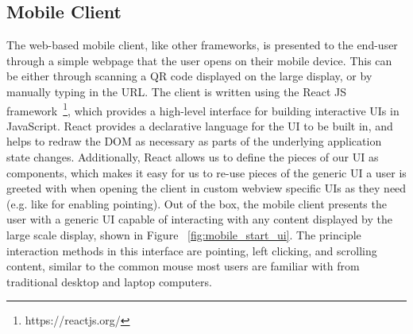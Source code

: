 \subsection{Mobile Client}

The web-based mobile client, like other frameworks, is presented to the end-user through a simple webpage that the user opens on their
mobile device. This
can be either through scanning a QR code displayed on the large
display, or by manually typing in the URL. The client is
written using the React JS
framework~\footnote{https://reactjs.org/}, which provides a
high-level interface for building interactive UIs in JavaScript.
React provides a declarative language for the UI to be built in,
and helps to redraw the DOM as necessary as parts of the underlying
application state changes. Additionally, React allows us to define
the pieces of our UI as components, which makes it easy for us to
re-use pieces of the generic UI a user is greeted with when opening
the client in custom webview specific UIs as they need (e.g. like
for enabling pointing).
Out of the box, the mobile client presents the user with a generic
UI capable of interacting with any content displayed by the
large scale display, shown in Figure ~\ref{fig:mobile_start_ui}. The principle interaction methods in this
interface are pointing, left clicking, and scrolling content, similar
to the common mouse most users are familiar with from traditional
desktop and laptop computers.

